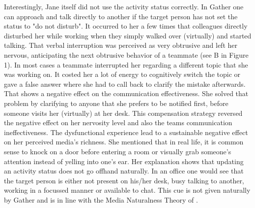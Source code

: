 \documentclass[man]{apa7}
\begin{document}
Interestingly, Jane itself did not use the activity status correctly. In Gather one can approach and talk directly to another if the target person has not set the status to "do not disturb". It occurred to her a few times that colleagues directly disturbed her while working when they simply walked over (virtually) and started talking. That verbal interruption was perceived as very obtrusive and left her nervous, anticipating the next obtrusive behavior of a teammate (see B in Figure 1). In most cases a teammate interrupted her regarding a different topic that she was working on. It costed her a lot of energy to cognitively switch the topic or gave a false answer where she had to call back to clarify the mistake afterwards. That shows a negative effect on the communication effectiveness. She solved that problem by clarifying to anyone that she prefers to be notified first, before someone visits her (virtually) at her desk. This compensation strategy reversed the negative effect on her nervosity level and also the teams communication ineffectiveness. The dysfunctional experience lead to a sustainable negative effect on her perceived media's richness. She mentioned that in real life, it is common sense to knock on a door before entering a room or visually grab someone's attention instead of yelling into one's ear. Her explanation shows that updating an activity status does not go offhand naturally. In an office one would see that the target person is either not present on his/her desk, busy talking to another, working in a focussed manner or available to chat. This cue is not given naturally by Gather and is in line with the Media Naturalness Theory of \citeauthor{Kock2005}.
\end{document}
